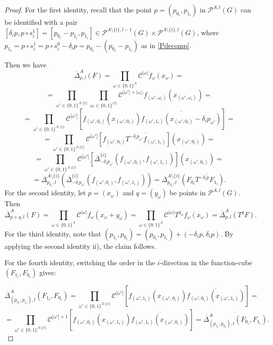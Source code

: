 \documentclass{amsart}
\theoremstyle{definition}
\theoremstyle{remark}
\numberwithin{equation}{section}
\begin{document}
\begin{proof}
For the first identity, recall that the point  $p=(p_{0_i},p_{1_i})$ in  $\mathcal{P}^{A,l}(G)$ can be identified with a pair 
$[\delta_i p , p \circ s_i^1 ] = [p_{0_i}-p_{1_i}, p_{1_i}]\in \mathcal{P}^{A \setminus \{i\},l-1}(G) \times   \mathcal{P}^{A \setminus \{i\},l}(G)$, where $p_{1_i} = p \circ s_i^1 = p \circ s_i^0 - \delta_i p = p_{0_i} - (p_{0_i} - p_{1_i})$ as in \eqref{Pdecomp}.

Then we have $$\overline{\Delta}^A_{p,l} (F) = \prod_{\omega \in \{0,1\}^A} \mathcal{C}^{|\omega|} f_\omega (x_\omega) = $$
$$ = \prod_{\omega' \in \{0,1\}^{A \setminus \{i\}}} \prod_{\omega_i \in \{0,1\}^{\{i\}}} \mathcal{C}^{|\omega'|+|\omega_i|} f_{(\omega', \omega_i)} (x_{(\omega', \omega_i )}) = $$
$$ = 
 \prod_{\omega' \in \{0,1\}^{A \setminus \{i\}}}  \mathcal{C}^{|\omega'|} \left[ f_{(\omega', 0_i)} (x_{(\omega', 0_i )}) \overline{f_{(\omega', 1_i)} (x_{(\omega', 0_i )} - {\delta_i p}_{\omega'} )} \right]= $$
$$ = 
 \prod_{\omega' \in \{0,1\}^{A \setminus \{i\}}}  \mathcal{C}^{|\omega'|} \left[ f_{(\omega', 0_i)}  \overline{T^{{-\delta_i p}_{\omega'}}f_{(\omega', 1_i)}} \right](x_{(\omega', 0_i )})= $$
 $$ = 
 \prod_{\omega' \in \{0,1\}^{A \setminus \{i\}}}  \mathcal{C}^{|\omega'|} \left[ \overline{\Delta}^{\{i\}}_{{-\delta_ip}_{\omega'}} \left(f_{(\omega', 0_i)} , f_{(\omega', 1_i)}\right) \right](x_{(\omega', 0_i )})= $$
 $$ = \overline{\Delta}^{A\setminus \{i\}}_{p_{0_i},l}\left( \overline{\Delta}^{\{i\}}_{{-\delta_ip}_{\omega'}} (f_{(\omega', 0_i)}, f_{(\omega', 1_i)})\right) = \overline{\Delta}^{A\setminus \{i\}}_{p_{0_i},l}\left( F_{0_i}\overline{T^{- \delta_i p}F_{1_i}}\right).$$
For the second identity, let $p=(x_\omega)$ and $q=(y_\omega)$ be points in $\mathcal{P}^{A,l}(G)$. Then  
$$\overline{\Delta}^A_{p+q,l} (F) = \prod_{\omega \in \{0,1\}^A} \mathcal{C}^{|\omega|} f_\omega (x_\omega + y_\omega) = 
\prod_{\omega \in \{0,1\}^A} \mathcal{C}^{|\omega|} T^{y_\omega}f_\omega (x_\omega) = 
\overline{\Delta}^A_{p,l} (T^qF).$$ 
For the third identity, note that $(p_{1_i},p_{0_i}) = (p_{0_i},p_{1_i}) + (-\delta_i p, \delta_i p)$. By applying the second identity ii), the claim follows.  

For the fourth identity, switching the order in the $i$-direction in the function-cube $ (F_{1_i}, F_{0_i})$ gives:

  $$\overline{\Delta}^A_{(p_{0_i},p_{1_i}),l} (F_{1_i}, F_{0_i}) =  \prod_{\omega' \in \{0,1\}^{A \setminus \{i\}}}  \mathcal{C}^{|\omega'|} \left[ f_{(\omega', 1_i)} (x_{(\omega', 0_i )}) \overline{f_{(\omega', 0_i)} (x_{(\omega', 1_i )} )} \right]= $$
 $$ 
  =  \prod_{\omega' \in \{0,1\}^{A \setminus \{i\}}}  \mathcal{C}^{|\omega'|+1} \left[ f_{(\omega', 0_i)} (x_{(\omega', 1_i )}) \overline{f_{(\omega', 1_i)} (x_{(\omega', 0_i )})} \right]= \overline{\overline{\Delta}^A_{(p_{1_i},p_{0_i}),l} (F_{0_i}, F_{1_i})}.
 $$
 

\end{proof}
\end{document}
